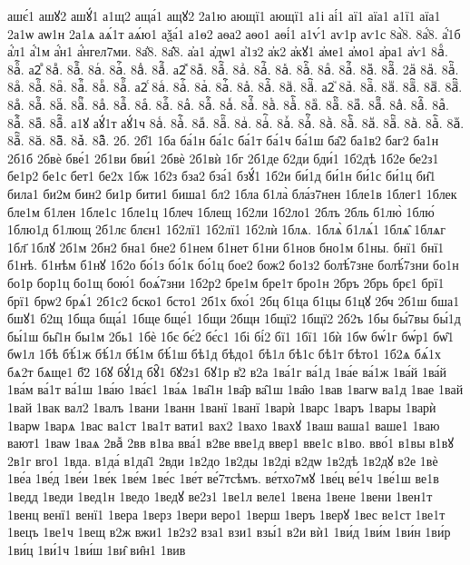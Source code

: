 {ашє́1
ашꙋ2
ашꙋ́1
а1щ2
аща́1
ащꙋ2
2а1ю
ающї1
ающї1
а1і
аі́1
аї1
аїа1
а1ї1
аїа1
2а1ѡ
аѡ1н
2а1ѧ
аѧ́1т
аѧ́ю1
аѯа́1
а1ѳ2
аѳа2
аѳо1
аѳі́1
а1ѵ́1
аѵ1р
аѵ1с
8а҆̀8.
8а҆́8.
а҆́1б
а҆́л1
а҆́1м
а҆́н1
а҆́нгел7ми.
8а҆̈8.
8а҆̑8.
а҆а1
а҆дѡ1
а҆1з2
а҆к2
а҆кꙋ1
а҆ме1
а҆мо1
а҆ра1
а҆ѵ1
8аⷠ.
8аⷠ҇.
а2ⷡ
8аⷡ.
8аⷡ҇.
8аⷢ.
8аⷢ҇.
8аⷣ.
8аⷣ҇.
а2ⷤ
8аⷤ.
8аⷤ҇.
8аⷥ.
8аⷥ҇.
8аⷦ.
8аⷦ҇.
8аⷧ.
8аⷧ҇.
8аⷨ.
8аⷨ҇.
2аⷩ
8аⷩ.
8аⷩ҇.
8аⷪ.
8аⷪ҇.
8аⷫ.
8аⷫ҇.
8аⷬ.
8аⷬ҇.
а2ⷭ
8аⷭ.
8аⷭ҇.
8аⷮ.
8аⷮ҇.
8аⷯ.
8аⷯ҇.
8аⷰ.
8аⷰ҇.
а2ⷱ
8аⷱ.
8аⷱ҇.
8аⷲ.
8аⷲ҇.
8аⷳ.
8аⷳ҇.
8аⷴ.
8аⷴ҇.
8аⷵ.
8аⷵ҇.
8аⷶ.
8аⷶ҇.
8аⷷ.
8аⷷ҇.
8аⷸ.
8аⷸ҇.
8аⷹ.
8аⷹ҇.
8аⷺ.
8аⷺ҇.
8аⷻ.
8аⷻ҇.
8аⷼ.
8аⷼ҇.
8аⷽ.
8аⷽ҇.
8аⷾ.
8аⷾ҇.
8аⷿ.
8аⷿ҇.
а1ꙋ
аꙋ́1т
аꙋ́1ч
8аꙴ.
8аꙴ҇.
8аꙵ.
8аꙵ҇.
8аꙶ.
8аꙶ҇.
8аꙷ.
8аꙷ҇.
8аꙸ.
8аꙸ҇.
8аꙹ.
8аꙹ҇.
8аꙺ.
8аꙺ҇.
8аꙻ.
8аꙻ҇.
8а꙼.
8а꙼҇.
8а꙽.
8а꙽҇.
2б.
2б̾1
1ба
ба́1н
ба́1с
ба́1т
ба́1ч
ба́1ш
ба̑2
ба1в2
баг2
ба1н
2б1б
2бвѐ
бве́1
2б1ви
бви́1
2бвѐ
2б1вѝ
1бг
2б1де
б2ди
бди́1
1б2дѣ
1б2е
бе2з1
бе1р2
бе1с
бет1
бе2х
1бж
1б2з
бза2
бза́1
бзꙋ́1
1б2и
би́1д
би́1н
би́1с
би́1ц
би̑1
била1
би2м
бин2
би1р
бити1
биша1
бл2
1бла
б1ла̀
бла́з7нен
1бле1в
1блег1
1блек
бле1м
б1лен
1бле1с
1бле1ц
1блеч
1блещ
1б2ли
1б2ло1
2блъ
2бль
б1лю̀
1блю́
1блю1д
б1лющ
2б1лє
блєн1
1б2лї1
1б2лї1
1б2лѝ
1блѧ.
1блѧ̀
б1лѧ́1
1блѧ̑
1блѧг
1бл҃
1блꙋ
2б1м
2бн2
бна1
бне2
б1нем
б1нет
б1ни
б1нов
бно1м
б1ны.
бнї1
бнї1
б1нѣ.
б1нѣм
б1нꙋ
1б2о
бо́1з
бо́1к
бо́1ц
бое2
бож2
бо1з2
болѣ́7зне
болѣ́7зни
бо1н
бо1р
бор1ц
бо1щ
бою́1
боѧ́7зни
1б2р2
бре1м
бре1т
бро1н
2бръ
2брь
брє1
брї1
брї1
брѡ2
брѧ́1
2б1с2
бско1
бсто1
2б1х
бхо́1
2бц
б1ца
б1цы
б1цꙋ
2бч
2б1ш
бша1
бшꙋ1
б2щ
1бща
бща́1
1бще
бще́1
1бщи
2бщн
1бщї2
1бщї2
2б2ъ
1бы
бы́7вы
бы́1д
бы́1ш
бы̑1н
бы1м
2бь1
1бѐ
1бє
бє́2
бє́с1
1бі
бі́2
бї1
1бї1
1бѝ
1бѡ
бѡ́1г
бѡ́р1
бѡ̑1
бѡ1л
1бѣ
бѣ́1ж
бѣ́1л
бѣ́1м
бѣ́1ш
бѣ1д
бѣдо1
бѣ1л
бѣ1с
бѣ1т
бѣто1
1б2ѧ
бѧ́1х
бѧ2т
бѧще1
б҃2
1бꙋ
бꙋ́1д
бꙋ̑1
бꙋ2з1
бꙋ1р
в̾2
в2а
1ва́1г
ва́1д
1ва́е
ва́1ж
1ва́й
1ва́й
1ва́м
ва́1т
ва́1ш
1ва́ю
1ва́є1
1ва́ѧ
1ва̑1н
1ва̑р
ва̑1ш
1ва̑ю
1вав
1вагѡ
ва1д
1вае
1вай
1вай
1вак
вал2
1валъ
1вани
1ванн
1ванї
1ванї
1варѝ
1варс
1варъ
1вары
1варѝ
1варѡ
1варѧ
1вас
ва1ст
1ва1т
вати1
вах2
1вахо
1вахꙋ
1ваш
ваша1
ваше1
1ваю
вают1
1ваѡ
1ваѧ
2ваⷤ
2вв
в1ва
вва́1
в2ве
вве1д
ввер1
вве1с
в1во.
вво́1
в1вы
в1вꙋ
2в1г
вго1
1вда.
в1да́
в1да̑1
2вди
1в2до
1в2ды
1в2ді
в2дѡ
1в2дѣ
1в2дꙋ
в2е
1вѐ
1ве́а
1ве́д
1ве́и
1ве́к
1ве́м
1ве́с
1ве́т
ве́7тсѣмъ.
ве́тхо7мꙋ
1ве́ц
ве́1ч
1ве́1ш
ве1в
1ведд
1веди
1вед1н
1ведо
1ведꙋ
ве2з1
1ве1л
веле1
1вена
1вене
1вени
1вен1т
1венц
венї1
венї1
1вера
1верз
1вери
веро1
1верш
1веръ
1верꙋ
1вес
ве1ст
1ве1т
1вецъ
1ве1ч
1вещ
в2ж
вжи1
1в2з2
вза1
взи1
взы́1
в2и
вѝ1
1ви́д
1ви́м
1ви́н
1ви́р
1ви́ц
1ви́1ч
1ви́ш
1ви̑
ви̑н1
1вив
}
